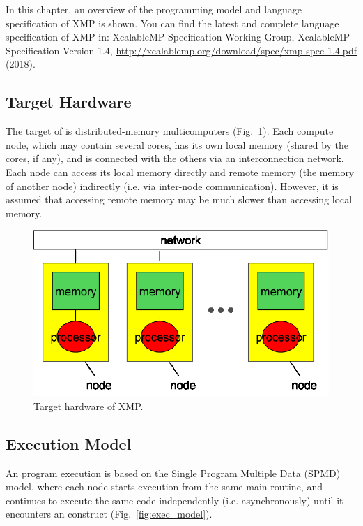 In this chapter, an overview of the programming model and language
specification of XMP is shown. You can find the latest and complete
language specification of XMP in: XcalableMP Specification Working
Group, XcalableMP Specification Version 1.4,
\url{http://xcalablemp.org/download/spec/xmp-spec-1.4.pdf} (2018).


\subsection{Target Hardware}

The target of {\XMP} is distributed-memory multicomputers
(Fig.~\ref{fig1}). Each compute node, which may contain several
cores, has
its own local memory (shared by the cores, if any), and is connected
with the others via an interconnection network.
%
Each node can access its local memory directly and remote memory (the
memory of another node) indirectly (i.e. via inter-node 
communication). However, it is assumed that accessing remote memory may
be much slower than accessing local memory.

\begin{figure}
  \centering
  \includegraphics[width=12cm]{figs/Fig1.eps}
  \caption{Target hardware of XMP.}\label{fig1}
\end{figure}


\subsection{Execution Model}

An {\XMP} program execution is based on the Single Program Multiple Data
(SPMD) model, where each node starts execution from the same main
routine, and continues to execute the same code independently
(i.e. asynchronously) until it encounters an {\XMP} construct
(Fig.~\ref{fig:exec_model}).

